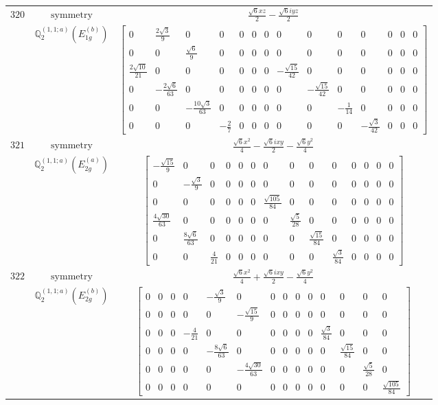 \documentclass[fleqn,8pt,landscape]{jsarticle}
\begin{document}
\begin{longtable}{ccc}
$ 320 $ & $ \text{symmetry} $ & $ \frac{\sqrt{6} x z}{2} - \frac{\sqrt{6} i y z}{2} $ \\
$  $ & $ \mathbb{Q}_{2}^{(1,1;a)}(E_{1g}^{(b)}) $ & $ \begin{bmatrix} 0 & \frac{2 \sqrt{3}}{9} & 0 & 0 & 0 & 0 & 0 & 0 & 0 & 0 & 0 & 0 & 0 & 0 \\ 0 & 0 & \frac{\sqrt{6}}{9} & 0 & 0 & 0 & 0 & 0 & 0 & 0 & 0 & 0 & 0 & 0 \\ \frac{2 \sqrt{10}}{21} & 0 & 0 & 0 & 0 & 0 & 0 & - \frac{\sqrt{15}}{42} & 0 & 0 & 0 & 0 & 0 & 0 \\ 0 & - \frac{2 \sqrt{6}}{63} & 0 & 0 & 0 & 0 & 0 & 0 & - \frac{\sqrt{15}}{42} & 0 & 0 & 0 & 0 & 0 \\ 0 & 0 & - \frac{10 \sqrt{3}}{63} & 0 & 0 & 0 & 0 & 0 & 0 & - \frac{1}{14} & 0 & 0 & 0 & 0 \\ 0 & 0 & 0 & - \frac{2}{7} & 0 & 0 & 0 & 0 & 0 & 0 & - \frac{\sqrt{3}}{42} & 0 & 0 & 0 \end{bmatrix} $ \\ \hline
$ 321 $ & $ \text{symmetry} $ & $ \frac{\sqrt{6} x^{2}}{4} - \frac{\sqrt{6} i x y}{2} - \frac{\sqrt{6} y^{2}}{4} $ \\
$  $ & $ \mathbb{Q}_{2}^{(1,1;a)}(E_{2g}^{(a)}) $ & $ \begin{bmatrix} - \frac{\sqrt{15}}{9} & 0 & 0 & 0 & 0 & 0 & 0 & 0 & 0 & 0 & 0 & 0 & 0 & 0 \\ 0 & - \frac{\sqrt{3}}{9} & 0 & 0 & 0 & 0 & 0 & 0 & 0 & 0 & 0 & 0 & 0 & 0 \\ 0 & 0 & 0 & 0 & 0 & 0 & \frac{\sqrt{105}}{84} & 0 & 0 & 0 & 0 & 0 & 0 & 0 \\ \frac{4 \sqrt{30}}{63} & 0 & 0 & 0 & 0 & 0 & 0 & \frac{\sqrt{5}}{28} & 0 & 0 & 0 & 0 & 0 & 0 \\ 0 & \frac{8 \sqrt{6}}{63} & 0 & 0 & 0 & 0 & 0 & 0 & \frac{\sqrt{15}}{84} & 0 & 0 & 0 & 0 & 0 \\ 0 & 0 & \frac{4}{21} & 0 & 0 & 0 & 0 & 0 & 0 & \frac{\sqrt{3}}{84} & 0 & 0 & 0 & 0 \end{bmatrix} $ \\ \hline
$ 322 $ & $ \text{symmetry} $ & $ \frac{\sqrt{6} x^{2}}{4} + \frac{\sqrt{6} i x y}{2} - \frac{\sqrt{6} y^{2}}{4} $ \\
$  $ & $ \mathbb{Q}_{2}^{(1,1;a)}(E_{2g}^{(b)}) $ & $ \begin{bmatrix} 0 & 0 & 0 & 0 & - \frac{\sqrt{3}}{9} & 0 & 0 & 0 & 0 & 0 & 0 & 0 & 0 & 0 \\ 0 & 0 & 0 & 0 & 0 & - \frac{\sqrt{15}}{9} & 0 & 0 & 0 & 0 & 0 & 0 & 0 & 0 \\ 0 & 0 & 0 & - \frac{4}{21} & 0 & 0 & 0 & 0 & 0 & 0 & \frac{\sqrt{3}}{84} & 0 & 0 & 0 \\ 0 & 0 & 0 & 0 & - \frac{8 \sqrt{6}}{63} & 0 & 0 & 0 & 0 & 0 & 0 & \frac{\sqrt{15}}{84} & 0 & 0 \\ 0 & 0 & 0 & 0 & 0 & - \frac{4 \sqrt{30}}{63} & 0 & 0 & 0 & 0 & 0 & 0 & \frac{\sqrt{5}}{28} & 0 \\ 0 & 0 & 0 & 0 & 0 & 0 & 0 & 0 & 0 & 0 & 0 & 0 & 0 & \frac{\sqrt{105}}{84} \end{bmatrix} $ \\ \hline

\end{longtable}
\end{document}
